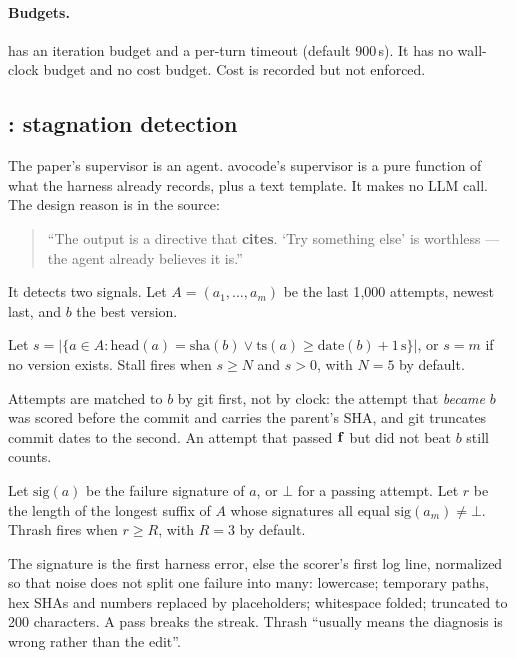 \paragraph{Budgets.}  has an iteration budget and a per-turn timeout (default 900\,s). It
has no wall-clock budget and no cost budget. Cost is recorded but not enforced.

\subsection{\texorpdfstring{}{avo supervise}: stagnation detection}
\label{sec:supervise}

The paper's supervisor is an agent. avocode's supervisor is a pure function of what the harness
already records, plus a text template. It makes no LLM call. The design reason is in the source:
\begin{quote}\small
``The output is a directive that \textbf{cites}. `Try something else' is worthless --- the agent
already believes it is.''
\end{quote}
It detects two signals. Let $A = (a_1, \ldots, a_m)$ be the last 1{,}000 attempts, newest last, and
$b$ the best version.

\begin{definition}[Stall]
Let $s = |\{a \in A : \mathrm{head}(a) = \mathrm{sha}(b) \vee \mathrm{ts}(a) \geq \mathrm{date}(b) +
1\,\mathrm{s}\}|$, or $s = m$ if no version exists. Stall fires when $s \geq N$ and $s > 0$, with
$N = 5$ by default.
\end{definition}
\noindent Attempts are matched to $b$ by git  first, not by clock: the attempt that
\emph{became} $b$ was scored before the commit and carries the parent's SHA, and git truncates
commit dates to the second. An attempt that passed $\mathbf{f}$ but did not beat $b$ still counts.

\begin{definition}[Thrash]
Let $\mathrm{sig}(a)$ be the failure signature of $a$, or $\bot$ for a passing attempt. Let $r$ be the
length of the longest suffix of $A$ whose signatures all equal $\mathrm{sig}(a_m) \neq \bot$. Thrash
fires when $r \geq R$, with $R = 3$ by default.
\end{definition}
\noindent The signature is the first harness error, else the scorer's first log line, normalized so
that noise does not split one failure into many: lowercase; temporary paths, hex SHAs and numbers
replaced by placeholders; whitespace folded; truncated to 200 characters. A pass breaks the streak.
Thrash ``usually means the diagnosis is wrong rather than the edit''.

